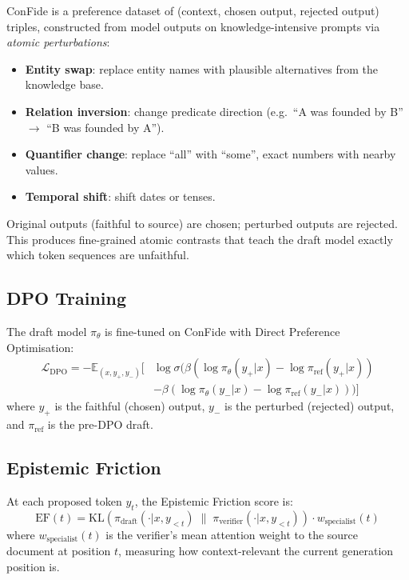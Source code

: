 \documentclass[10pt,twocolumn]{article}
\begin{document}
ConFide is a preference dataset of (context, chosen output, rejected output)
triples, constructed from model outputs on knowledge-intensive prompts
via \emph{atomic perturbations}:
\begin{itemize}[itemsep=1pt,parsep=0pt]
  \item \textbf{Entity swap}: replace entity names with plausible alternatives
    from the knowledge base.
  \item \textbf{Relation inversion}: change predicate direction
    (e.g.\ ``A was founded by B'' $\to$ ``B was founded by A'').
  \item \textbf{Quantifier change}: replace ``all'' with ``some'',
    exact numbers with nearby values.
  \item \textbf{Temporal shift}: shift dates or tenses.
\end{itemize}
Original outputs (faithful to source) are chosen; perturbed outputs are
rejected. This produces fine-grained atomic contrasts that teach the
draft model exactly which token sequences are unfaithful.

\subsection{DPO Training}

The draft model $\pi_\theta$ is fine-tuned on ConFide with Direct
Preference Optimisation:
\begin{align}
  \mathcal{L}_\mathrm{DPO} = -\mathbb{E}_{(x, y_+, y_-)}\bigl[
  &\log \sigma\bigl(\beta(\log \pi_\theta(y_+|x) - \log \pi_\mathrm{ref}(y_+|x)) \nonumber\\
  &- \beta(\log \pi_\theta(y_-|x) - \log \pi_\mathrm{ref}(y_-|x))\bigr)\bigr]
\end{align}
where $y_+$ is the faithful (chosen) output, $y_-$ is the perturbed
(rejected) output, and $\pi_\mathrm{ref}$ is the pre-DPO draft.

\subsection{Epistemic Friction}

At each proposed token $y_t$, the Epistemic Friction score is:
\[
  \mathrm{EF}(t) =
  \mathrm{KL}\!\left(\pi_\mathrm{draft}(\cdot|x, y_{<t}) \;\|\;
                     \pi_\mathrm{verifier}(\cdot|x, y_{<t})\right)
  \cdot w_\mathrm{specialist}(t)
\]
where $w_\mathrm{specialist}(t)$ is the verifier's mean attention weight
to the source document at position $t$, measuring how context-relevant
the current generation position is.
\end{document}
